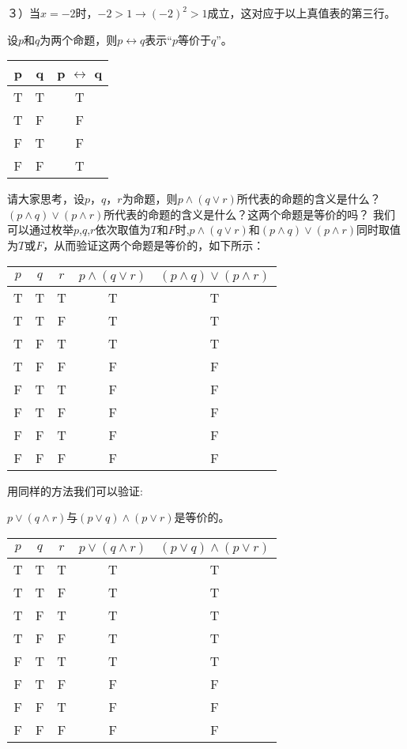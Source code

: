 \documentclass{article}
\begin{document}
\begin{CJK}{UTF8}{gbsn}
    ３）当$x=-2$时，$-2>1 \to (-2)^2 > 1$成立，这对应于以上真值表的第三行。
    
设$p$和$q$为两个命题，则$p\leftrightarrow q$表示“$p$等价于$q$”。  

  \begin{tabular}{cc|c}
    p& q& p $\leftrightarrow$ q\\
    \hline
    T&T&T\\
    T&F&F\\
    F&T&F\\
    F&F&T\\
  \end{tabular}

  请大家思考，设$p$，$q$，$r$为命题，则$p\land (q\lor r)$所代表的命题的含义是什么？$(p\land q)\lor (p \land r)$所代表的命题的含义是什么？这两个命题是等价的吗？
  我们可以通过枚举$p$,$q$,$r$依次取值为$T$和$F$时,$p\land (q\lor r)$和$(p\land q)\lor (p \land r)$同时取值为$T$或$F$，从而验证这两个命题是等价的，如下所示：

    \begin{tabular}{ccc|cc}
    $p$& $q$& $r$& $p\land (q\lor r)$&$(p\land q)\lor (p \land r)$\\
    \hline
   T& T&T&T&T\\
    T&T&F&T&T\\
    T&F&T&T&T\\
     T& F&F&F&F\\
    F&T&T&F&F\\
    F&T&F&F&F\\
   F& F&T&F&F\\
    F&  F&F&F&F\\      
  \end{tabular}

  用同样的方法我们可以验证:

  $p\lor (q\land r)$与$(p\lor q)\land (p \lor r)$是等价的。

      \begin{tabular}{ccc|cc}
    $p$& $q$& $r$&$p\lor (q\land r)$ &$(p\lor q)\land (p \lor r)$\\
    \hline
    T&T&T&T&T\\
    T&T&F&T&T\\
    T&F&T&T&T\\
     T& F&F&T&T\\
    F&T&T&T&T\\
    F&T&F&F&F\\
    F&F&T&F&F\\
     F&F&F&F&F\\
  \end{tabular}



\end{CJK}
\end{document}
